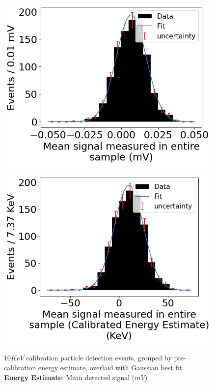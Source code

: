 \begin{figure}[H]
	\begin{minipage}[t]{0.45\linewidth}
		\begin{center}
            \label{fig::area1}
			\includegraphics[width=\textwidth]{figures/area1.png}
			\caption{
                $10\unit{KeV}$ calibration particle detection events, grouped by pre-calibration energy estimate, overlaid with Gaussian best fit.\\
                \textbf{Energy Estimate}: Mean detected signal ($\unit{mV}$)
            }
		\end{center}
	\end{minipage}
    \hfill
	\begin{minipage}[t]{0.45\linewidth}
		\begin{center}
            \label{fig::area1--cal}
			\includegraphics[width=\textwidth]{figures/area1--calibrated.png}

\end{center}
\end{minipage}
\end{figure}
